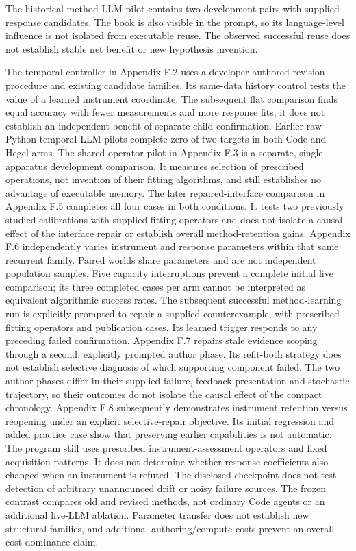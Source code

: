 \documentclass[11pt,a4paper]{article}
\begin{document}
The historical-method LLM pilot contains two development pairs with supplied
response candidates. The book is also visible in the prompt, so its language-level
influence is not isolated from executable reuse. The observed successful reuse
does not establish stable net benefit or new hypothesis invention.


The temporal controller in Appendix F.2 uses a developer-authored revision
procedure and existing candidate families. Its same-data history control tests
the value of a learned instrument coordinate. The subsequent flat comparison
finds equal accuracy with fewer measurements and more response fits; it does
not establish an independent benefit of separate child confirmation.
Earlier raw-Python temporal LLM pilots complete zero of two targets in both Code
and Hegel arms. The shared-operator pilot in Appendix F.3 is a separate,
single-apparatus development comparison. It measures selection of prescribed
operations, not invention of their fitting algorithms, and still establishes
no advantage of executable memory. The later repaired-interface comparison in
Appendix F.5 completes all four cases in both conditions. It tests two previously
studied calibrations with supplied fitting operators and does not isolate a
causal effect of the interface repair or establish overall method-retention gains.
Appendix F.6 independently varies instrument and response parameters within that
same recurrent family. Paired worlds share parameters and are not independent
population samples. Five capacity interruptions prevent a complete initial live
comparison; its three completed cases per arm cannot be interpreted as equivalent
algorithmic success rates. The subsequent successful method-learning run is
explicitly prompted to repair a supplied counterexample, with prescribed fitting
operators and publication cases. Its learned trigger responds to any preceding
failed confirmation. Appendix F.7 repairs stale evidence scoping through a second,
explicitly prompted author phase. Its refit-both strategy does not establish
selective diagnosis of which supporting component failed. The two author phases
differ in their supplied failure, feedback presentation and stochastic trajectory,
so their outcomes do not isolate the causal effect of the compact chronology.
Appendix F.8 subsequently demonstrates instrument retention versus reopening
under an explicit selective-repair objective. Its initial regression and added
practice case show that preserving earlier capabilities is not automatic.
The program still uses prescribed instrument-assessment operators and fixed
acquisition patterns. It does not determine whether response coefficients also
changed when an instrument is refuted. The disclosed checkpoint does not test
detection of arbitrary unannounced drift or noisy failure sources.
The frozen contrast compares old and revised methods, not ordinary Code agents or
an additional live-LLM ablation. Parameter transfer does not establish new structural
families, and additional authoring/compute costs prevent an overall cost-dominance claim.
\end{document}
